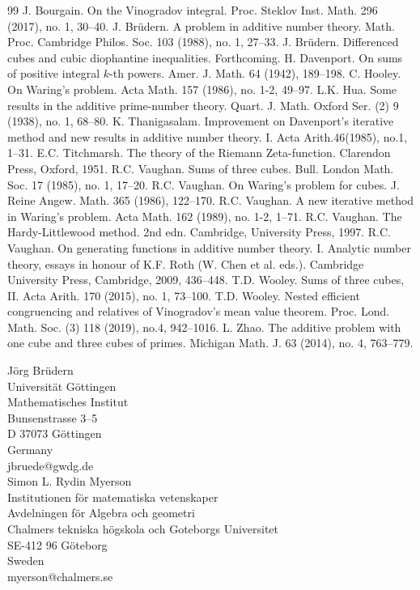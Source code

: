 \documentclass[reqno]{amsart}
\numberwithin{equation}{section}
\begin{document}
\begin{thebibliography}{99}
 J. Bourgain. On the Vinogradov integral. Proc. Steklov Inst. Math. 296 (2017), no. 1, 30--40.
 J. Br\"udern.  A problem in additive number theory.
Math. Proc. Cambridge Philos. Soc. 103 (1988), no. 1, 27--33.
 J. Br\"udern. Differenced cubes and cubic diophantine inequalities. Forthcoming.
 H. Davenport. On sums of positive integral $k$-th powers.
Amer. J. Math. 64 (1942), 189–198.
 C. Hooley. On Waring's problem. Acta Math. 157 (1986), no. 1-2, 49–97.
 L.K. Hua. Some results in the additive prime-number theory.
Quart. J. Math. Oxford Ser. (2) 9 (1938), no. 1, 68--80.
 K. Thanigasalam. Improvement on Davenport's iterative method and new results in additive number theory. I.
Acta Arith.46(1985), no.1, 1–31.
E.C. Titchmarsh. The theory of the Riemann Zeta-function. Clarendon Press, Oxford, 1951.
 R.C. Vaughan. Sums of three cubes.
Bull. London Math. Soc. 17 (1985), no. 1, 17--20.
 R.C. Vaughan. On Waring's problem for cubes.
J. Reine Angew. Math. 365 (1986), 122--170.
 R.C. Vaughan. A new iterative method in Waring's problem.
Acta Math. 162 (1989), no. 1-2, 1--71.
 R.C. Vaughan. The Hardy-Littlewood method. 2nd edn. Cambridge, University Press, 1997.
 R.C. Vaughan. On generating functions in additive number theory. I. Analytic number theory,
essays in honour of K.F. Roth (W. Chen et al. eds.).
Cambridge University Press, Cambridge, 2009, 436--448.
 T.D. Wooley. Sums of three cubes, II. Acta Arith. 170 (2015), no. 1, 73–100.
 T.D. Wooley. Nested efficient congruencing and relatives of Vinogradov's mean value theorem.
Proc. Lond. Math. Soc. (3) 118 (2019), no.4, 942--1016.
 L. Zhao. The additive problem with one cube and three cubes of primes.
Michigan Math. J. 63 (2014), no. 4, 763--779.
\end{thebibliography}

\vspace{2ex}\noindent
 J\"org Br\"udern \\
 Universit\"at G\"ottingen\\
Mathematisches Institut\\
Bunsenstrasse 3--5\\
D 37073 G\"ottingen \\
Germany\\
jbruede@gwdg.de\\
[2ex]
Simon L. Rydin  Myerson\\
Institutionen f\"or matematiska vetenskaper\\
Avdelningen f\"or Algebra och geometri\\
Chalmers tekniska h\"ogskola och Goteborgs Universitet\\
SE-412 96 G\"oteborg\\
Sweden\\
myerson@chalmers.se
\end{document}
